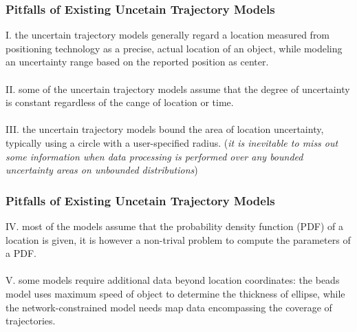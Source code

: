 
\begin{frame}
\frametitle{Pitfalls of Existing Uncetain Trajectory Models}

\textrm{I.} \quad the uncertain trajectory models generally regard a location measured from positioning technology as a precise, actual location of an object, while modeling an uncertainty range based on the reported position as center.\\~\\

\textrm{II.} \quad some of the uncertain trajectory models assume that the degree of uncertainty is constant regardless of the cange of location or time.\\~\\

\textrm{III.} \quad the uncertain trajectory models bound the area of location uncertainty, typically using a circle with a user-specified radius. (\textit{it is inevitable to miss out some information when data processing is performed over any bounded uncertainty areas on unbounded distributions})

\end{frame}


\begin{frame}
\frametitle{Pitfalls of Existing Uncetain Trajectory Models}

\textrm{IV.} \quad most of the models assume that the probability density function (PDF) of a location is given, it is however a non-trival problem to compute the parameters of a PDF. \\~\\

\textrm{V.} \quad some models require additional data beyond location coordinates: the beads model uses maximum speed of object to determine the thickness of ellipse, while the network-constrained model needs map data encompassing the coverage of trajectories.

\end{frame}
